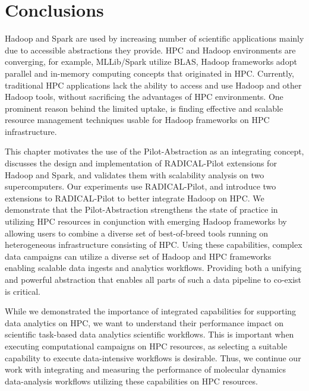 \section{Conclusions}
\label{sec:hpc_hadoop_concl}

Hadoop and Spark are used by increasing number of scientific applications mainly due to accessible abstractions they provide.
HPC and Hadoop environments are converging, for example, MLLib/Spark utilize BLAS, Hadoop frameworks adopt parallel and in-memory computing concepts that originated in HPC.
Currently, traditional HPC applications lack the ability to access and use Hadoop and other Hadoop tools, without sacrificing the advantages of HPC environments.
One prominent reason behind the limited uptake, is finding effective and scalable resource management techniques usable for Hadoop frameworks on HPC infrastructure.

This chapter motivates the use of the Pilot-Abstraction as an integrating concept, discusses the design and implementation of RADICAL-Pilot extensions for Hadoop and Spark, and validates them with scalability analysis on two supercomputers.
Our experiments use RADICAL-Pilot, and introduce two extensions to RADICAL-Pilot to better integrate Hadoop on HPC.
We demonstrate that the Pilot-Abstraction strengthens the state of practice in utilizing HPC resources in conjunction with emerging Hadoop frameworks by allowing users to combine a diverse set of best-of-breed tools running on heterogeneous infrastructure consisting of HPC.
Using these capabilities, complex data campaigns can utilize a diverse set of Hadoop and HPC frameworks enabling scalable data ingests and analytics workflows.
Providing both a unifying and powerful abstraction that enables all parts of such a data pipeline to co-exist is critical.

While we demonstrated the importance of integrated capabilities for supporting data analytics on HPC, we want to understand their performance impact on scientific task-based data analytics scientific workflows.
This is important when executing computational campaigns on HPC resources, as selecting a suitable capability to execute data-intensive workflows is desirable.
Thus, we continue our work with integrating and measuring the performance of molecular dynamics data-analysis workflows utilizing these capabilities on HPC resources.

